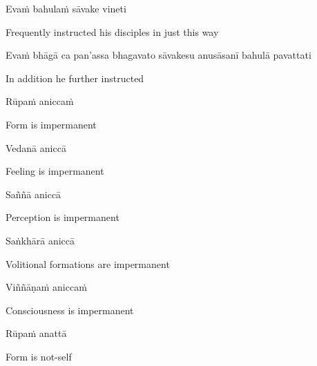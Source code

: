 Evaṁ bahulaṁ sāvake vineti

\begin{english}
  Frequently instructed his disciples in just this way
\end{english}

\begin{pali-hang}
  Evaṁ bhāgā ca pan'assa bhagavato sāvakesu anusāsanī bahulā pavattati
\end{pali-hang}

\begin{english}
  In addition he further instructed
\end{english}

\suttaRef{[Thai]}

Rūpaṁ aniccaṁ

\begin{english}
  Form is impermanent
\end{english}

Vedanā aniccā

\begin{english}
  Feeling is impermanent
\end{english}

Saññā aniccā

\begin{english}
  Perception is impermanent
\end{english}

Saṅkhārā aniccā

\begin{english}
  Volitional formations are impermanent\ifdigitalversion\makeatletter\hyperlink{endnote18-appendix}\makeatother\fi
\end{english}

Viññāṇaṁ aniccaṁ

\begin{english}
  Consciousness is impermanent\ifdigitalversion\makeatletter\hyperlink{endnote19-appendix}\makeatother\fi
\end{english}

Rūpaṁ anattā

\begin{english}
  Form is not-self
\end{english}

